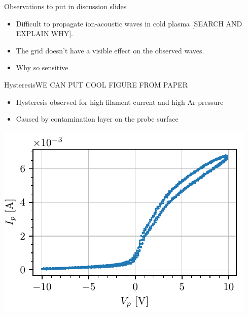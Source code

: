 \documentclass[10pt]{beamer}
\begin{document}
\begin{frame}{Observations to put in discussion slides}
    \begin{itemize}
        \item Difficult to propagate ion-acoustic waves in cold plasma [SEARCH AND EXPLAIN WHY].
        \item The grid doesn't have a visible effect on the observed waves.
        \item Why so sensitive
    \end{itemize}
\end{frame}


\begin{frame}{Hysteresis}{WE CAN PUT COOL FIGURE FROM PAPER}
    \begin{itemize}
        \item Hysteresis observed for high filament current and high Ar pressure
        \item Caused by contamination layer on the probe surface 
    \end{itemize}
    \begin{center}
        \includegraphics[scale=1]{../figures/hysteresis.pdf}
    \end{center}

\end{frame}
\end{document}
